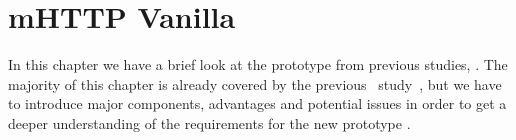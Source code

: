 \chapter{mHTTP Vanilla}
\label{ch:vanilla} 


In this chapter we have a brief look at the prototype from previous studies, \protoold. 
The majority of this chapter is already covered by the previous \mhttp~study~\cite{KIM13-MHTTP}, but we have to introduce major components, advantages and potential issues in order to get a deeper understanding of the requirements for the new prototype \protonew. 
